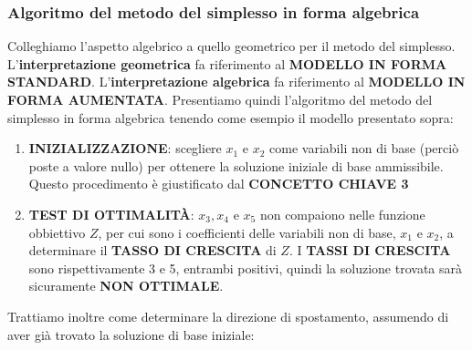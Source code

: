 \documentclass[12pt]{article}
\begin{document}
\subsubsection{Algoritmo del metodo del simplesso in forma algebrica}
Colleghiamo l'aspetto algebrico a quello geometrico per il metodo del simplesso.
L'\textbf{interpretazione geometrica} fa riferimento al \textbf{MODELLO IN FORMA STANDARD}. \newline
L'\textbf{interpretazione algebrica} fa riferimento al \textbf{MODELLO IN FORMA AUMENTATA}.
Presentiamo quindi l'algoritmo del metodo del simplesso in forma algebrica tenendo come esempio il modello presentato sopra:
\begin{enumerate}
    \item \textbf{INIZIALIZZAZIONE}: scegliere $x_1$ e $x_2$ come variabili non di base (perciò poste a valore nullo) per ottenere la soluzione iniziale di base ammissibile. Questo procedimento è giustificato dal \textbf{CONCETTO CHIAVE 3}
    \item \textbf{TEST DI OTTIMALITÀ}: $x_3, x_4$ e $x_5$ non compaiono nelle funzione obbiettivo $Z$, per cui sono i coefficienti delle variabili non di base, $x_1$ e $x_2$, a determinare il \textbf{TASSO DI CRESCITA} di $Z$.
    I \textbf{TASSI DI CRESCITA} sono rispettivamente 3 e 5, entrambi positivi, quindi la soluzione trovata sarà sicuramente \textbf{NON OTTIMALE}.
\end{enumerate}
Trattiamo inoltre come determinare la direzione di spostamento, assumendo di aver già trovato la soluzione di base iniziale:
\end{document}
